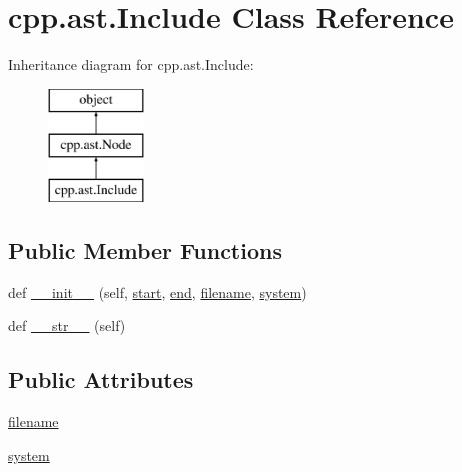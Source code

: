 \hypertarget{classcpp_1_1ast_1_1_include}{}\section{cpp.\+ast.\+Include Class Reference}
\label{classcpp_1_1ast_1_1_include}
Inheritance diagram for cpp.\+ast.\+Include\+:\begin{figure}[H]
\begin{center}
\leavevmode
\includegraphics[height=3.000000cm]{d7/d69/classcpp_1_1ast_1_1_include}
\end{center}
\end{figure}
\subsection*{Public Member Functions}
\begin{DoxyCompactItemize}
\item 
def \mbox{\hyperlink{classcpp_1_1ast_1_1_include_a41b000a9f16a9a1840e56a761bb7045c}{\+\_\+\+\_\+init\+\_\+\+\_\+}} (self, \mbox{\hyperlink{classcpp_1_1ast_1_1_node_a7b2aa97e6a049bb1a93aea48c48f1f44}{start}}, \mbox{\hyperlink{classcpp_1_1ast_1_1_node_a3c5e5246ccf619df28eca02e29d69647}{end}}, \mbox{\hyperlink{classcpp_1_1ast_1_1_include_a9ecff64f127655d3c17e9abe4ebe3852}{filename}}, \mbox{\hyperlink{classcpp_1_1ast_1_1_include_a2e8e535b1af7d9b0ff94d0ae9f86e5c5}{system}})
\item 
def \mbox{\hyperlink{classcpp_1_1ast_1_1_include_ad7d9e5e8f46dcb1a91a282e609412a3e}{\+\_\+\+\_\+str\+\_\+\+\_\+}} (self)
\end{DoxyCompactItemize}
\subsection*{Public Attributes}
\begin{DoxyCompactItemize}
\item 
\mbox{\hyperlink{classcpp_1_1ast_1_1_include_a9ecff64f127655d3c17e9abe4ebe3852}{filename}}
\item 
\mbox{\hyperlink{classcpp_1_1ast_1_1_include_a2e8e535b1af7d9b0ff94d0ae9f86e5c5}{system}}
\end{DoxyCompactItemize}


